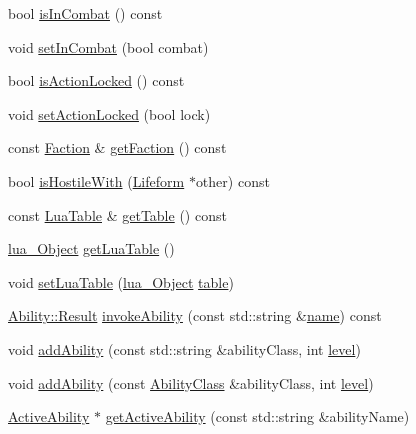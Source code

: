 \begin{DoxyCompactItemize}
bool \hyperlink{classZeta_1_1Lifeform_a82ca96737248ec7c54d85dbdf0321350}{is\+In\+Combat} () const 
\item 
void \hyperlink{classZeta_1_1Lifeform_ad8ce2bed937c57d7d910faaeebfa749b}{set\+In\+Combat} (bool combat)
\item 
bool \hyperlink{classZeta_1_1Lifeform_a2ef9b9dd2514a407ad65e15990f884da}{is\+Action\+Locked} () const 
\item 
void \hyperlink{classZeta_1_1Lifeform_aeeb1a2452c3acdc50ba5cec0a915eebb}{set\+Action\+Locked} (bool lock)
\item 
const \hyperlink{classZeta_1_1Faction}{Faction} \& \hyperlink{classZeta_1_1Lifeform_a431fc4a72875c866dc9f3ebec2afe3f9}{get\+Faction} () const 
\item 
bool \hyperlink{classZeta_1_1Lifeform_a9f2ece92dddf8e595b81ecf3f3e6b354}{is\+Hostile\+With} (\hyperlink{classZeta_1_1Lifeform}{Lifeform} $\ast$other) const 
\item 
const \hyperlink{classZeta_1_1LuaTable}{Lua\+Table} \& \hyperlink{classZeta_1_1Lifeform_ae38a019dfa3a731a6c5e95bf612779c4}{get\+Table} () const 
\item 
\hyperlink{ZetaConfig_8hpp_ae7be32b73848041a60f2412f72bbb221}{lua\+\_\+\+Object} \hyperlink{classZeta_1_1Lifeform_a8e9c92fc82b434e9d80b0713a528ebd5}{get\+Lua\+Table} ()
\item 
void \hyperlink{classZeta_1_1Lifeform_ac7a5c5413c89b1cdcdeef9d4b21a7e97}{set\+Lua\+Table} (\hyperlink{ZetaConfig_8hpp_ae7be32b73848041a60f2412f72bbb221}{lua\+\_\+\+Object} \hyperlink{classZeta_1_1Lifeform_a21a6e67148dc921adb0ae02af0e8e729}{table})
\item 
\hyperlink{classZeta_1_1Ability_acbc80e4d82c9683d190ed8ca1c80f597}{Ability\+::\+Result} \hyperlink{classZeta_1_1Lifeform_aa6e3b3db07a9650bfec718aeb2525223}{invoke\+Ability} (const std\+::string \&\hyperlink{classZeta_1_1Object_ace4ef81b7c300e0a170292e9888cd66f}{name}) const 
\item 
void \hyperlink{classZeta_1_1Lifeform_a58147d47cdd9b90ce3fa47db85671c5b}{add\+Ability} (const std\+::string \&ability\+Class, int \hyperlink{classZeta_1_1Lifeform_aca50d42a46ffaa5e478fb434ccd39e6e}{level})
\item 
void \hyperlink{classZeta_1_1Lifeform_ac8cda46923f9bf4a6bc75de0725c9a49}{add\+Ability} (const \hyperlink{classZeta_1_1AbilityClass}{Ability\+Class} \&ability\+Class, int \hyperlink{classZeta_1_1Lifeform_aca50d42a46ffaa5e478fb434ccd39e6e}{level})
\item 
\hyperlink{classZeta_1_1ActiveAbility}{Active\+Ability} $\ast$ \hyperlink{classZeta_1_1Lifeform_a0ce2976074f8659b196ca27510eb5674}{get\+Active\+Ability} (const std\+::string \&ability\+Name)

\end{DoxyCompactItemize}
